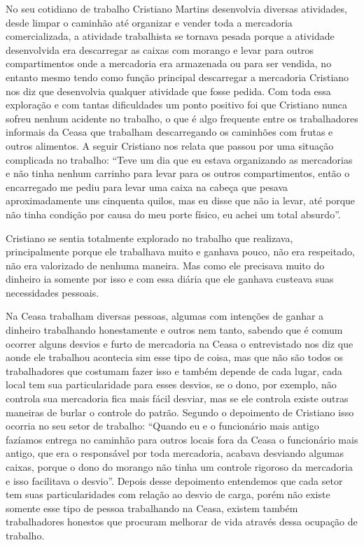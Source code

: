  No seu cotidiano de trabalho Cristiano Martins desenvolvia diversas atividades, desde limpar o caminhão
 até organizar e vender toda a mercadoria comercializada, a atividade trabalhista se tornava pesada porque
 a atividade desenvolvida era descarregar as caixas com morango e levar para outros compartimentos onde a
 mercadoria era armazenada ou para ser vendida, no entanto mesmo tendo como função principal descarregar 
 a mercadoria Cristiano nos diz que desenvolvia qualquer atividade que fosse pedida. Com toda essa exploração
 e com tantas dificuldades um ponto positivo foi que Cristiano nunca sofreu nenhum acidente no trabalho, 
 o que é algo frequente entre os trabalhadores informais da Ceasa que trabalham descarregando os caminhões
 com frutas e outros alimentos. A seguir Cristiano nos relata que passou por uma situação complicada no 
 trabalho: ``Teve um dia que eu estava organizando as mercadorias e não tinha nenhum carrinho para levar
 para os outros compartimentos, então o encarregado me pediu para levar uma caixa na cabeça que pesava 
 aproximadamente uns cinquenta quilos, mas eu disse que não ia levar, até porque não tinha condição por 
 causa do meu porte físico, eu achei um total absurdo''.

 Cristiano se sentia totalmente explorado no trabalho que realizava, principalmente porque ele trabalhava
 muito e ganhava pouco, não era respeitado, não era valorizado de nenhuma maneira. Mas como ele precisava 
 muito do dinheiro ia somente por isso e com essa diária que ele ganhava custeava suas necessidades pessoais.

 Na Ceasa trabalham diversas pessoas, algumas com intenções de ganhar a dinheiro trabalhando honestamente
 e outros nem tanto, sabendo que é comum ocorrer alguns desvios e furto de mercadoria na Ceasa o entrevistado 
 nos diz que aonde ele trabalhou acontecia sim esse tipo de coisa, mas que não são todos os trabalhadores que
 costumam fazer isso e também depende de cada lugar, cada local tem sua particularidade para esses desvios,
 se o dono, por exemplo, não controla sua mercadoria fica mais fácil desviar, mas se ele controla existe 
 outras maneiras de burlar o controle do patrão. Segundo o depoimento de Cristiano isso ocorria no seu setor
 de trabalho: “Quando eu e o funcionário mais antigo fazíamos entrega no caminhão para outros locais fora da
 Ceasa o funcionário mais antigo, que era o responsável por toda mercadoria, acabava desviando algumas caixas,
 porque o dono do morango não tinha um controle rigoroso da mercadoria e isso facilitava o desvio”. Depois 
 desse depoimento entendemos que cada setor tem suas particularidades com relação ao desvio de carga, porém 
 não existe somente esse tipo de pessoa trabalhando na Ceasa, existem também trabalhadores honestos que 
 procuram melhorar de vida através dessa ocupação de trabalho.

